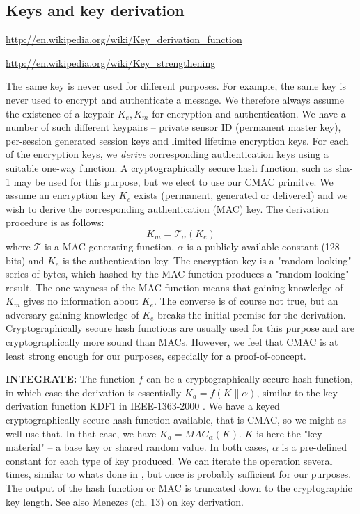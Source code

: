 \subsection{Keys and key derivation}

\url{http://en.wikipedia.org/wiki/Key_derivation_function}

\url{http://en.wikipedia.org/wiki/Key_strengthening}

The same key is never used for different purposes. For example, the same key is never used to encrypt and authenticate a message. We therefore always assume the existence of a keypair $K_e,K_m$ for encryption and authentication.
%
We have a number of such different keypairs -- private sensor ID (permanent master key), per-session generated session keys and limited lifetime encryption keys. For each of the encryption keys, we \textit{derive} corresponding authentication keys using a suitable one-way function. A cryptographically secure hash function, such as sha-1 \cite{} may be used for this purpose, but we elect to use our CMAC primitve. We assume an encryption key $K_e$ exists (permanent, generated or delivered) and we wish to derive the corresponding authentication (MAC) key. The derivation procedure is as follows:
\[
K_m = \mathcal{T}_\alpha(K_e)
\]
where $\mathcal{T}$ is a MAC generating function, $\alpha$ is a publicly available constant (128-bits) and $K_e$ is the authentication key. The encryption key is a "random-looking" series of bytes, which hashed by the MAC function produces a "random-looking" result. The one-wayness of the MAC function means that gaining knowledge of $K_m$ gives no information about $K_e$. The converse is of course not true, but an adversary gaining knowledge of $K_e$ breaks the initial premise for the derivation. Cryptographically secure hash functions are usually used for this purpose and are cryptographically more sound than MACs. However, we feel that CMAC is at least strong enough for our purposes, especially for a proof-of-concept.

\textbf{INTEGRATE:}
The function $f$ can be a cryptographically secure hash function, in which case the derivation is essentially $K_a = f(K \parallel \alpha)$, similar to the key derivation function KDF1 in IEEE-1363-2000 \cite{ieee-1363-2000}. We have a keyed cryptographically secure hash function available, that is CMAC, so we might as well use that. In that case, we have $K_a = MAC_{\alpha}(K)$. $K$ is here the "key material" -- a base key or shared random value. In both cases, $\alpha$ is a pre-defined constant for each type of key produced. We can iterate the operation several times, similar to whats done in , but once is probably sufficient for our purposes. The output of the hash function or MAC is truncated down to the cryptographic key length. See also Menezes (ch. 13) on key derivation.

